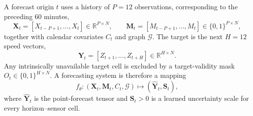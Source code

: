 \documentclass[preprint,12pt]{elsarticle}
\begin{document}
A forecast origin $t$ uses a history of $P=12$ observations, corresponding to
the preceding 60 minutes,
\begin{equation}
 \mathbf{X}_t=[X_{t-P+1},\ldots,X_t]\in\mathbb{R}^{P\times N},\qquad
 \mathbf{M}_t=[M_{t-P+1},\ldots,M_t]\in\{0,1\}^{P\times N},
\end{equation}
together with calendar covariates $C_t$ and graph $\mathcal{G}$. The target is
the next $H=12$ speed vectors,
\begin{equation}
 \mathbf{Y}_t=[Z_{t+1},\ldots,Z_{t+H}]\in\mathbb{R}^{H\times N}.
 \label{eq:forecast-target}
\end{equation}
Any intrinsically unavailable target cell is excluded by a target-validity
mask $O_t\in\{0,1\}^{H\times N}$. A forecasting system is therefore a mapping
\begin{equation}
 f_{\theta}:(\mathbf{X}_t,\mathbf{M}_t,C_t,\mathcal{G})
 \longmapsto (\widehat{\mathbf{Y}}_t,\mathbf{S}_t),
 \label{eq:probabilistic-forecast-map}
\end{equation}
where $\widehat{\mathbf{Y}}_t$ is the point-forecast tensor and
$\mathbf{S}_t>0$ is a learned uncertainty scale for every horizon--sensor
cell.
\end{document}
